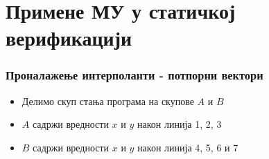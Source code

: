 \documentclass{beamer}
\begin{document}
\section{Примене МУ у статичкој верификацији}
\begin{frame}[fragile]
\frametitle{Проналажење интерполанти - потпорни вектори}

\begin{itemize}
    \item Делимо скуп стања програма на скупове $A$ и $B$
    \item $A$ садржи вредности $x$ и  $y$ након линија 1, 2, 3
    \item $B$ садржи вредности $x$ и $y$ након линија 4, 5, 6 и 7
\end{itemize}





\end{frame}
\end{document}

